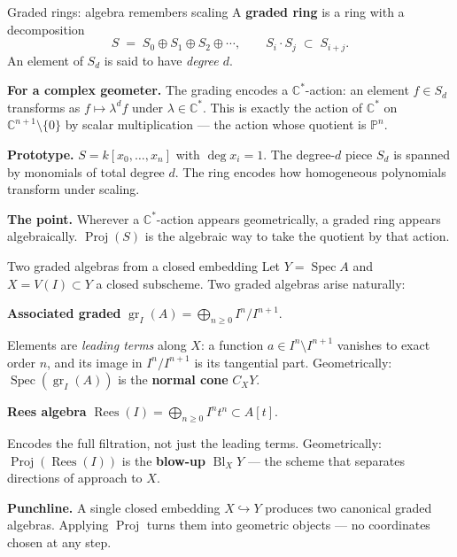 \documentclass[aspectratio=169,12pt]{beamer}
\begin{document}
\begin{frame}{Graded rings: algebra remembers scaling}
  A \textbf{graded ring} is a ring with a decomposition
  \[
    S \;=\; S_0 \oplus S_1 \oplus S_2 \oplus \cdots,
    \qquad S_i \cdot S_j \;\subset\; S_{i+j}.
  \]
  An element of $S_d$ is said to have \emph{degree $d$}.

  \medskip

  \textbf{For a complex geometer.}\enspace
  The grading encodes a $\mathbb{C}^*$-action:
  an element $f \in S_d$ transforms as
  $f \mapsto \lambda^d f$ under $\lambda \in \mathbb{C}^*$.
  This is exactly the action of $\mathbb{C}^*$ on
  $\mathbb{C}^{n+1} \setminus \{0\}$ by scalar multiplication —
  the action whose quotient is $\mathbb{P}^n$.

  \medskip

  \textbf{Prototype.}\enspace
  $S = k[x_0, \ldots, x_n]$ with $\deg x_i = 1$.
  The degree-$d$ piece $S_d$ is spanned by monomials of total degree $d$.
  The ring encodes how homogeneous polynomials transform under scaling.

  \medskip

  \textbf{The point.}\enspace
  Wherever a $\mathbb{C}^*$-action appears geometrically,
  a graded ring appears algebraically.
  $\operatorname{Proj}(S)$ is the algebraic way to take the quotient
  by that action.
\end{frame}

\begin{frame}{Two graded algebras from a closed embedding}
  Let $Y = \operatorname{Spec} A$ and $X = V(I) \subset Y$ a closed
  subscheme.
  Two graded algebras arise naturally:

  \medskip

  \textbf{Associated graded} $\operatorname{gr}_I(A)
    = \bigoplus_{n \geq 0} I^n/I^{n+1}$.

  Elements are \emph{leading terms} along $X$:
  a function $a \in I^n \setminus I^{n+1}$ vanishes to exact order $n$,
  and its image in $I^n/I^{n+1}$ is its tangential part.
  Geometrically: $\operatorname{Spec}(\operatorname{gr}_I(A))$
  is the \textbf{normal cone} $C_X Y$.

  \smallskip

  \textbf{Rees algebra} $\operatorname{Rees}(I)
    = \bigoplus_{n \geq 0} I^n t^n \subset A[t]$.

  Encodes the full filtration, not just the leading terms.
  Geometrically: $\operatorname{Proj}(\operatorname{Rees}(I))$
  is the \textbf{blow-up} $\operatorname{Bl}_X Y$ — the scheme that
  separates directions of approach to $X$.

  \medskip

  \textbf{Punchline.}\enspace
  A single closed embedding $X \hookrightarrow Y$ produces two canonical
  graded algebras.
  Applying $\operatorname{Proj}$ turns them into geometric objects —
  no coordinates chosen at any step.
\end{frame}
\end{document}

